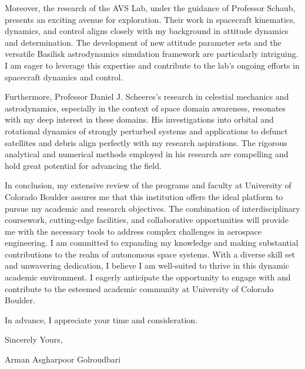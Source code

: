 \documentclass[a4,20pt]{article}
\begin{document}
\begin{large}
Moreover, the research of the AVS Lab, under the guidance of Professor Schaub, presents an exciting avenue for exploration. Their work in spacecraft kinematics, dynamics, and control aligns closely with my background in attitude dynamics and determination. The development of new attitude parameter sets and the versatile Basilisk astrodynamics simulation framework are particularly intriguing. I am eager to leverage this expertise and contribute to the lab's ongoing efforts in spacecraft dynamics and control. \vspace{-0.35cm}

Furthermore, Professor Daniel J. Scheeres's research in celestial mechanics and astrodynamics, especially in the context of space domain awareness, resonates with my deep interest in these domains. His investigations into orbital and rotational dynamics of strongly perturbed systems and applications to defunct satellites and debris align perfectly with my research aspirations. The rigorous analytical and numerical methods employed in his research are compelling and hold great potential for advancing the field. \vspace{-0.35cm}

In conclusion, my extensive review of the programs and faculty at University of Colorado Boulder assures me that this institution offers the ideal platform to pursue my academic and research objectives. The combination of interdisciplinary coursework, cutting-edge facilities, and collaborative opportunities will provide me with the necessary tools to address complex challenges in aerospace engineering. I am committed to expanding my knowledge and making substantial contributions to the realm of autonomous space systems. With a diverse skill set and unwavering dedication, I believe I am well-suited to thrive in this dynamic academic environment. I eagerly anticipate the opportunity to engage with and contribute to the esteemed academic community at University of Colorado Boulder. \vspace{-0.15cm}

In advance, I appreciate your time and consideration. \par
\vspace{-0.4cm} Sincerely Yours, \par
\vspace{-0.4cm}Arman Asgharpoor Golroudbari \par
\end{large}
\end{document}

